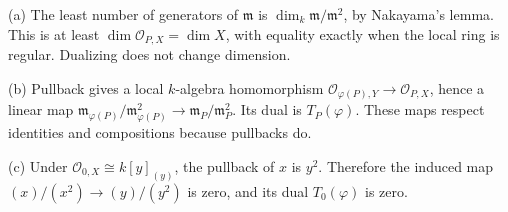 (a) The least number of generators of $\mathfrak m$ is $\dim_k\mathfrak m/\mathfrak m^2$, by Nakayama's lemma. This is at least $\dim\mathcal O_{P,X}=\dim X$, with equality exactly when the local ring is regular. Dualizing does not change dimension.

(b) Pullback gives a local $k$-algebra homomorphism $\mathcal O_{\varphi(P),Y}\to\mathcal O_{P,X}$, hence a linear map $\mathfrak m_{\varphi(P)}/\mathfrak m_{\varphi(P)}^2\to\mathfrak m_P/\mathfrak m_P^2$. Its dual is $T_P(\varphi)$. These maps respect identities and compositions because pullbacks do.

(c) Under $\mathcal O_{0,X}\cong k[y]_{(y)}$, the pullback of $x$ is $y^2$. Therefore the induced map $(x)/(x^2)\to(y)/(y^2)$ is zero, and its dual $T_0(\varphi)$ is zero.
